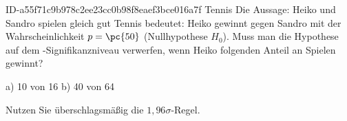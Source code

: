\begin{exercise}
      {ID-a55f71c9b978c2ee23cc0b98f8eaef3bce016a7f}
      {Tennis}
  \ifproblem\problem
    Die Aussage: \glqq Heiko und Sandro spielen gleich gut Tennis\grqq{}
    bedeutet: Heiko gewinnt gegen Sandro mit der Wahrscheinlichkeit $p=\pc{50}$
    (Nullhypothese $H_0$). Muss man die Hypothese auf dem -Signifikanzniveau
    verwerfen, wenn Heiko folgenden Anteil an Spielen gewinnt?
    \begin{center}
      a) 10 von 16
      \qquad\qquad\qquad
      b) 40 von 64
    \end{center}
    Nutzen Sie überschlagsmäßig die $1,\!96\sigma$-Regel.
  \fi
\end{exercise}
